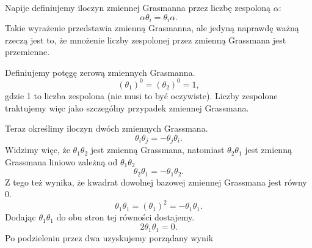 \documentclass[a4paper,11pt]{article}
\begin{document}
Napije definiujemy iloczyn zmiennej Grasmanna przez liczbę zespoloną $\alpha$:
\begin{equation}
  \label{eq:Zmienne-Grassmana-01}
  \alpha \theta_{ i } = \theta_{ i } \alpha.
\end{equation}
Takie wyrażenie przedstawia zmienną Grasmanna, ale jedyną naprawdę ważną rzeczą jest to, że mnożenie liczby zespolonej przez zmienną Grassmana jest przemienne.

Definiujemy potęgę zerową zmiennych Grasmanna.
\begin{equation}
  \label{eq:Zmienne-Grassmana-02}
  ( \theta_{ 1 } )^{ 0 } = ( \theta_{ 2 } )^{ 0 } = 1,
\end{equation}
gdzie 1 to liczba zespolona (nie musi to być oczywiste). Liczby zespolone traktujemy więc jako szczególny przypadek zmiennej Grassmana.

Teraz określimy iloczyn dwóch zmiennych Grassmana.
\begin{equation}
  \label{eq:Zmienne-Grassmana-03}
  \theta_{ i } \theta_{ j } = -\theta_{ j } \theta_{ i }.
\end{equation}
Widzimy więc, że $\theta_{ 1 } \theta_{ 2 }$ jest zmienną Grassmana, natomiast $\theta_{ 2 } \theta_{ 1 }$ jest zmienną Grassmana liniowo zależną od $\theta_{ 1 } \theta_{ 2 }$
\begin{equation}
  \label{eq:Zmienne-Grassmana-03}
  \theta_{ 2 } \theta_{ 1 } = -\theta_{ 1 } \theta_{ 2 }.
\end{equation}
Z tego też wynika, że kwadrat dowolnej bazowej zmiennej Grassmana jest równy 0.
\begin{equation}
  \label{eq:Zmienne-Grassmana-05}
  \theta_{ 1 } \theta_{ 1 } = ( \theta_{ 1 } )^{ 2 } = -\theta_{ 1 } \theta_{ 1 }.
\end{equation}
Dodając $\theta_{ 1 } \theta_{ 1 }$ do obu stron tej równości dostajemy.
\begin{equation}
  \label{eq:Zmienne-Grassmana-06}
  2 \theta_{ 1 } \theta_{ 1 } = 0.
\end{equation}
Po podzieleniu przez dwa uzyskujemy porządany wynik
\end{document}
